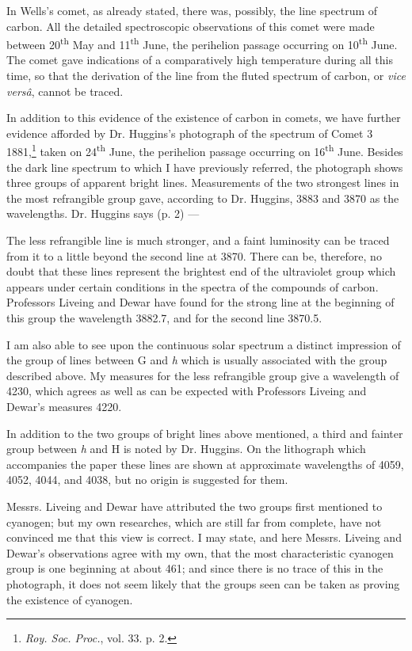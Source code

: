 \documentclass[a4paper, 12pt, oneside, polutonikogreek, english]{article}
\begin{document}
In Wells's comet, as already stated, there was, possibly, the line spectrum of carbon. All the detailed spectroscopic observations of this comet were made between 20\textsuperscript{th} May and 11\textsuperscript{th} June, the perihelion passage occurring on 10\textsuperscript{th} June. The comet gave indications of a comparatively high temperature during all this time, so that the derivation of the line from the fluted spectrum of carbon, or \emph{vice versâ}, cannot be traced.

In addition to this evidence of the existence of carbon in comets, we have further evidence afforded by Dr. Huggins's photograph of the spectrum of Comet 3 1881,\footnote{\emph{Roy. Soc. Proc.}, vol. 33. p. 2.} taken on 24\textsuperscript{th} June, the perihelion passage occurring on 16\textsuperscript{th} June. Besides the dark line spectrum to which I have previously referred, the photograph shows three groups of apparent bright lines. Measurements of the two strongest lines in the most refrangible group gave, according to Dr. Huggins, 3883 and 3870 as the wavelengths. Dr. Huggins says (p. 2) ---

The less refrangible line is much stronger, and a faint luminosity can be traced from it to a little beyond the second line at 3870. There can be, therefore, no doubt that these lines represent the brightest end of the ultraviolet group which appears under certain conditions in the spectra of the compounds of carbon. Professors Liveing and Dewar have found for the strong line at the beginning of this group the wavelength 3882.7, and for the second line 3870.5.

I am also able to see upon the continuous solar spectrum a distinct impression of the group of lines between G and \emph{h} which is usually associated with the group described above. My measures for the less refrangible group give a wavelength of 4230, which agrees as well as can be expected with Professors Liveing and Dewar's measures 4220.

In addition to the two groups of bright lines above mentioned, a third and fainter group between \emph{h} and H is noted by Dr. Huggins. On the lithograph which accompanies the paper these lines are shown at approximate wavelengths of 4059, 4052, 4044, and 4038, but no origin is suggested for them.

Messrs. Liveing and Dewar have attributed the two groups first mentioned to cyanogen; but my own researches, which are still far from complete, have not convinced me that this view is correct. I may state, and here Messrs. Liveing and Dewar's observations agree with my own, that the most characteristic cyanogen group is one beginning at about 461; and since there is no trace of this in the photograph, it does not seem likely that the groups seen can be taken as proving the existence of cyanogen.
\end{document}
